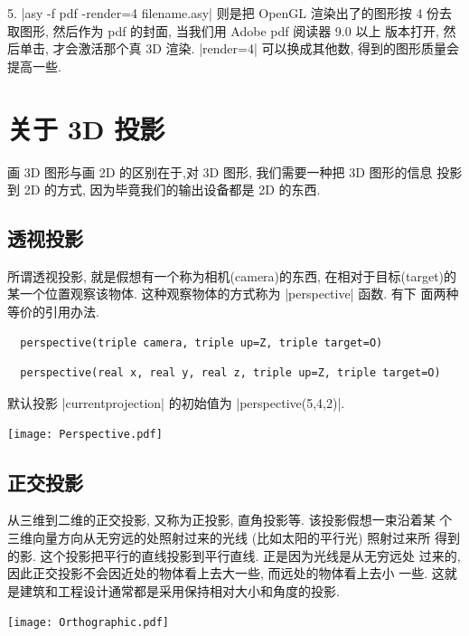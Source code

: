 \documentclass[nofonts,CJKnormalspaces]{ctexbook}[2009/05/20]
\begin{document}
5. |asy -f pdf -render=4 filename.asy| 则是把 OpenGL 渲染出了的图形按
4 份去取图形, 然后作为 pdf 的封面, 当我们用 Adobe pdf 阅读器 9.0 以上
版本打开, 然后单击, 才会激活那个真 3D 渲染. |render=4| 可以换成其他数,
得到的图形质量会提高一些.

\section{关于 3D 投影}
画 3D 图形与画 2D 的区别在于,对 3D 图形, 我们需要一种把 3D 图形的信息
投影到 2D 的方式, 因为毕竟我们的输出设备都是 2D 的东西.

\subsection{透视投影}
所谓透视投影, 就是假想有一个称为相机(camera)的东西, 在相对于目标(target)的
某一个位置观察该物体. 这种观察物体的方式称为 |perspective| 函数. 有下
面两种等价的引用办法.
\begin{lstlisting}
  perspective(triple camera, triple up=Z, triple target=O)
\end{lstlisting}

\begin{lstlisting}
  perspective(real x, real y, real z, triple up=Z, triple target=O)
\end{lstlisting}
默认投影 |currentprojection| 的初始值为 |perspective(5,4,2)|.

\begin{center}\texttt{[image: Perspective.pdf]}\end{center}%



\subsection{正交投影}
从三维到二维的正交投影, 又称为正投影, 直角投影等. 该投影假想一束沿着某
个三维向量方向从无穷远的处照射过来的光线 (比如太阳的平行光) 照射过来所
得到的影. 这个投影把平行的直线投影到平行直线. 正是因为光线是从无穷远处
过来的, 因此正交投影不会因近处的物体看上去大一些, 而远处的物体看上去小
一些. 这就是建筑和工程设计通常都是采用保持相对大小和角度的投影.
\begin{center}\texttt{[image: Orthographic.pdf]}\end{center}%

\end{document}
